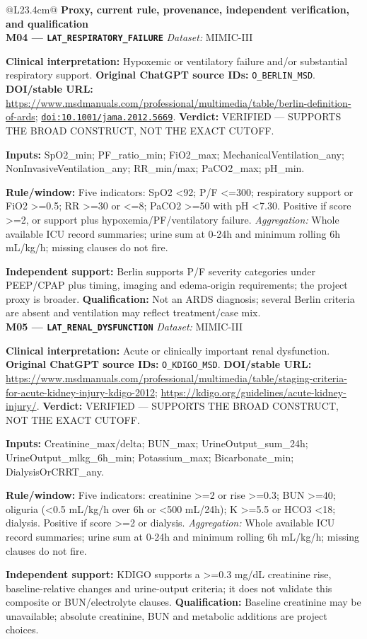 \begin{tabular}{@{}L{23.4cm}@{}}
\toprule
\textbf{Proxy, current rule, provenance, independent verification, and qualification}\\
\midrule
\textbf{M04 --- \nolinkurl{LAT_RESPIRATORY_FAILURE}} \hfill \textit{Dataset:} MIMIC-III\par\textbf{Clinical interpretation:} Hypoxemic or ventilatory failure and/or substantial respiratory support. \textbf{Original ChatGPT source IDs:} \nolinkurl{O_BERLIN_MSD}. \textbf{DOI/stable URL:} \url{https://www.msdmanuals.com/professional/multimedia/table/berlin-definition-of-ards}; \allowbreak \href{https://doi.org/10.1001/jama.2012.5669}{\nolinkurl{doi:10.1001/jama.2012.5669}}. \textbf{Verdict:} VERIFIED --- SUPPORTS THE BROAD CONSTRUCT, NOT THE EXACT CUTOFF.\par\textbf{Inputs:} SpO2\_min; PF\_ratio\_min; FiO2\_max; MechanicalVentilation\_any; NonInvasiveVentilation\_any; RR\_min/max; PaCO2\_max; pH\_min.\par\textbf{Rule/window:} Five indicators: SpO2 <92; P/F <=300; respiratory support or FiO2 >=0.5; RR >=30 or <=8; PaCO2 >=50 with pH <7.30. Positive if score >=2, or support plus hypoxemia/PF/ventilatory failure. \textit{Aggregation:} Whole available ICU record summaries; urine sum at 0-24h and minimum rolling 6h mL/kg/h; missing clauses do not fire.\par\textbf{Independent support:} Berlin supports P/F severity categories under PEEP/CPAP plus timing, imaging and edema-origin requirements; the project proxy is broader. \textbf{Qualification:} Not an ARDS diagnosis; several Berlin criteria are absent and ventilation may reflect treatment/case mix. \\
\addlinespace[3pt]
\midrule
\textbf{M05 --- \nolinkurl{LAT_RENAL_DYSFUNCTION}} \hfill \textit{Dataset:} MIMIC-III\par\textbf{Clinical interpretation:} Acute or clinically important renal dysfunction. \textbf{Original ChatGPT source IDs:} \nolinkurl{O_KDIGO_MSD}. \textbf{DOI/stable URL:} \url{https://www.msdmanuals.com/professional/multimedia/table/staging-criteria-for-acute-kidney-injury-kdigo-2012}; \allowbreak \url{https://kdigo.org/guidelines/acute-kidney-injury/}. \textbf{Verdict:} VERIFIED --- SUPPORTS THE BROAD CONSTRUCT, NOT THE EXACT CUTOFF.\par\textbf{Inputs:} Creatinine\_max/delta; BUN\_max; UrineOutput\_sum\_24h; UrineOutput\_mlkg\_6h\_min; Potassium\_max; Bicarbonate\_min; DialysisOrCRRT\_any.\par\textbf{Rule/window:} Five indicators: creatinine >=2 or rise >=0.3; BUN >=40; oliguria (<0.5 mL/kg/h over 6h or <500 mL/24h); K >=5.5 or HCO3 <18; dialysis. Positive if score >=2 or dialysis. \textit{Aggregation:} Whole available ICU record summaries; urine sum at 0-24h and minimum rolling 6h mL/kg/h; missing clauses do not fire.\par\textbf{Independent support:} KDIGO supports a >=0.3 mg/dL creatinine rise, baseline-relative changes and urine-output criteria; it does not validate this composite or BUN/electrolyte clauses. \textbf{Qualification:} Baseline creatinine may be unavailable; absolute creatinine, BUN and metabolic additions are project choices. \\

\end{tabular}
